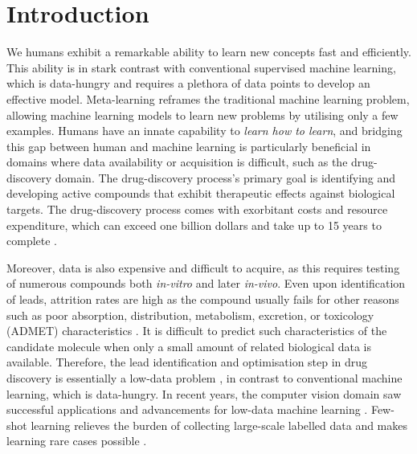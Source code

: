 \section{Introduction}

We humans exhibit a remarkable ability to learn new concepts fast and efficiently. This ability is in stark contrast with conventional supervised machine learning, which is data-hungry and requires a plethora of data points to develop an effective model. Meta-learning reframes the traditional machine learning problem, allowing machine learning models to learn new problems by utilising only a few examples. Humans have an innate capability to \textit{learn how to learn}, and bridging this gap between human and machine learning is particularly beneficial in domains where data availability or acquisition is difficult, such as the drug-discovery domain. The drug-discovery process's primary goal is identifying and developing active compounds that exhibit therapeutic effects against biological targets. The drug-discovery process comes with exorbitant costs and resource expenditure, which can exceed one billion dollars and take up to 15 years to complete \cite{hughes2011principles}.

Moreover, data is also expensive and difficult to acquire, as this requires testing of numerous compounds both \textit{in-vitro} and later \textit{in-vivo}. Even upon identification of leads, attrition rates are high as the compound usually fails for other reasons such as poor absorption, distribution, metabolism, excretion, or toxicology (ADMET) characteristics \cite{waring2015analysis}. It is difficult to predict such characteristics of the candidate molecule when only a small amount of related biological data is available. Therefore, the lead identification and optimisation step in drug discovery is essentially a low-data problem \cite{altae2017low}, in contrast to conventional machine learning, which is data-hungry. In recent years, the computer vision domain saw successful applications and advancements for low-data machine learning \cite{koch2015siamese, vinyals2016matching, snell2017prototypical, sung2018learning}. Few-shot learning relieves the burden of collecting large-scale labelled data and makes learning rare cases possible \cite{wang2020generalizing}. 

